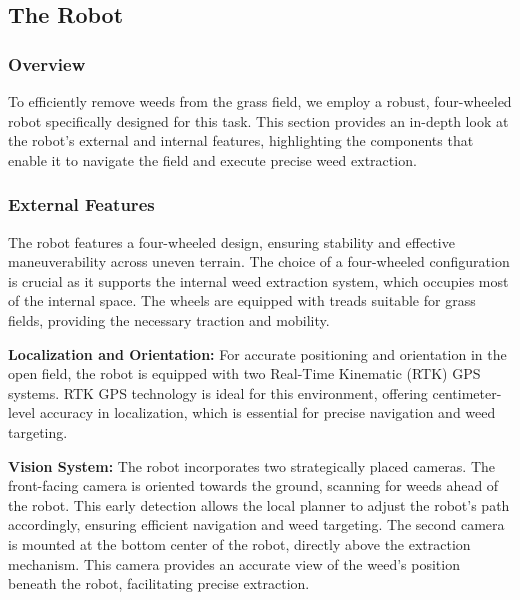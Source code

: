\vspace*{6mm}

\subsection{The Robot}

\subsubsection{Overview}

To efficiently remove weeds from the grass field, we employ a robust, four-wheeled robot specifically designed for this task. This section provides an in-depth look at the robot's external and internal features, highlighting the components that enable it to navigate the field and execute precise weed extraction.

\subsubsection{External Features}

The robot features a four-wheeled design, ensuring stability and effective maneuverability across uneven terrain. The choice of a four-wheeled configuration is crucial as it supports the internal weed extraction system, which occupies most of the internal space. The wheels are equipped with treads suitable for grass fields, providing the necessary traction and mobility.

\vspace*{6mm}

\textbf{Localization and Orientation:} For accurate positioning and orientation in the open field, the robot is equipped with two Real-Time Kinematic (RTK) GPS systems. RTK GPS technology is ideal for this environment, offering centimeter-level accuracy in localization, which is essential for precise navigation and weed targeting.

\vspace*{6mm}


\textbf{Vision System:} The robot incorporates two strategically placed cameras. The front-facing camera is oriented towards the ground, scanning for weeds ahead of the robot. This early detection allows the local planner to adjust the robot's path accordingly, ensuring efficient navigation and weed targeting. The second camera is mounted at the bottom center of the robot, directly above the extraction mechanism. This camera provides an accurate view of the weed's position beneath the robot, facilitating precise extraction.


